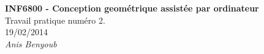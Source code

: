 \begin{titlepage}
    \vspace*{3.5cm}
    \begin{center} 
        \LARGE{ \textbf{INF6800 - Conception geométrique assistée par ordinateur} }\\[1cm]
        \Large{Travail pratique numéro 2.}\\
        \normalsize{19/02/2014}\\[1cm]
        \normalsize{ \textit{Anis Benyoub} }
    	\begin{figure}[ht]
	\centering
	\end{figure}
    \end{center}
    
\end{titlepage}